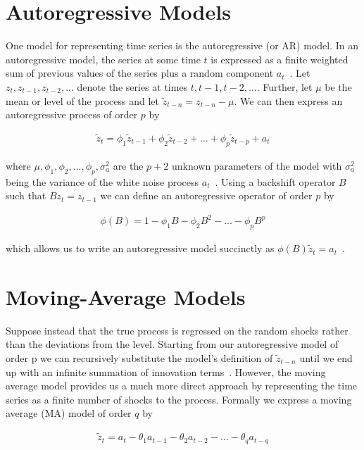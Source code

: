 \documentclass[oneside,12pt,openany]{book}
\begin{document}
	\section{Autoregressive Models}

	 One model for representing time series is the autoregressive (or AR) model. In an autoregressive model, the series at some time $t$ is expressed as a finite weighted sum of previous values of the series plus a random component $a_{t}$~\cite{Box}. Let $z_{t}, z_{t-1}, z_{t-2},...$ denote the series at times $t, t-1, t-2,...$. Further, let $\mu$ be the mean or level of the process and let $\tilde{z}_{t-n}=z_{t-n}-\mu$. We can then express an autoregressive process of order $p$ by
	
	\begin{align}
		\label{eqn:armodel}
		\tilde{z}_{t}=\phi_{1} \tilde{z}_{t-1}+\phi_{2} \tilde{z}_{t-2}+...+\phi_{p} \tilde{z}_{t-p}+a_{t}
	\end{align}
	
	\noindent where $\mu, \phi_{1}, \phi_{2}, ..., \phi_{p}, \sigma^{2}_{a}$ are the $p+2$ unknown parameters of the model with $\sigma^{2}_{a}$ being the variance of the white noise process $a_{t}$~\cite{Box}. Using a backshift operator $B$ such that $Bz_{t}=z_{t-1}$ we can define an autoregressive operator of order $p$ by
	
	\begin{align}
		\label{eqn:arop}
		\phi(B)=1-\phi_{1}B-\phi_{2}B^{2}-...-\phi_{p}B^{p}
	\end{align}
	
	\noindent which allows us to write an autoregressive model succinctly as $\phi(B)\tilde{z}_{t}=a_{t}$~\cite{Box}.

	\section{Moving-Average Models}
	
	Suppose instead that the true process is regressed on the random shocks rather than the deviations from the level. Starting from our autoregressive model  of order p we can recursively substitute the model's definition of $\tilde{z}_{t-n}$ until we end up with an infinite summation of innovation terms~\cite{Box}. However, the moving average model provides us a much more direct approach by representing the time series as a finite number of shocks to the process. Formally we express a moving average (MA) model of order $q$ by
	
	\begin{align}
		\label{eqn:mamodel}
		\tilde{z}_{t}=a_{t}-\theta_{1}a_{t-1}-\theta_{2}a_{t-2}-...-\theta_{q}a_{t-q}
	\end{align}
	
\end{document}

